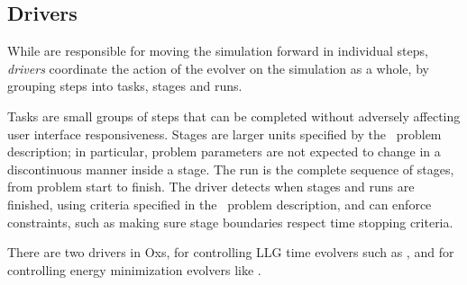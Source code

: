 \subsection{Drivers\label{sec:oxsDrivers}}
While  are
responsible for moving the simulation forward in individual steps,
\textit{drivers} coordinate the action of the evolver on the
simulation as a whole, by grouping steps into tasks, stages and runs.

Tasks are small groups of steps that can be completed without adversely
affecting user interface responsiveness.  Stages are larger units
specified by the \MIF\ problem description; in particular, problem
parameters are not expected to change in a discontinuous manner inside a
stage.  The run is the complete sequence of stages, from problem start to
finish.  The driver detects when stages and runs are finished, using
criteria specified in the \MIF\ problem description, and can enforce
constraints, such as making sure stage boundaries respect time stopping
criteria.

There are two drivers in Oxs,
for controlling LLG time evolvers such as
,
and
for controlling energy minimization evolvers like
.

